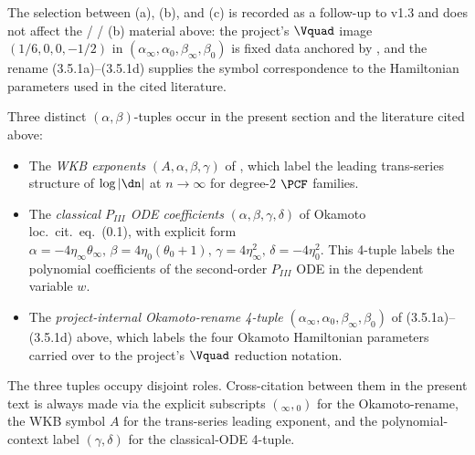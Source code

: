 The selection between (a), (b), and (c) is recorded as a
follow-up to v1.3 and does not affect the  /
 / (b) material above:
the project's $\Vquad$ image $(1/6, 0, 0, -1/2)$ in
$(\alpha_\infty, \alpha_0, \beta_\infty, \beta_0)$ is fixed
data anchored by \cite{iwasaki1991from, ohyama2006studies},
and the rename (3.5.1a)--(3.5.1d) supplies the symbol
correspondence to the Hamiltonian parameters used in the cited
literature.

\begin{remark}
\label{rem:alpha-beta-tuples}
Three distinct $(\alpha, \beta)$-tuples occur in the present
section and the literature cited above:
\begin{itemize}
\item The {\em WKB exponents} $(A, \alpha, \beta, \gamma)$ of
, which label the leading trans-series
structure of $\log|\dn|$ at $n \to \infty$ for degree-$2$
$\PCF$ families.
\item The {\em classical $P_{III}$ ODE coefficients}
$(\alpha, \beta, \gamma, \delta)$ of Okamoto loc.\ cit.\
eq.\ (0.1), with explicit form
$\alpha = -4 \eta_\infty \theta_\infty,\,
\beta = 4 \eta_0 (\theta_0 + 1),\,
\gamma = 4 \eta_\infty^{2},\,
\delta = -4 \eta_0^{2}$. This 4-tuple labels the polynomial
coefficients of the second-order $P_{III}$ ODE in the
dependent variable $w$.
\item The {\em project-internal Okamoto-rename 4-tuple}
$(\alpha_\infty, \alpha_0, \beta_\infty, \beta_0)$ of
(3.5.1a)--(3.5.1d) above, which labels the four Okamoto
Hamiltonian parameters carried over to the project's
$\Vquad$ reduction notation.
\end{itemize}
The three tuples occupy disjoint roles. Cross-citation between
them in the present text is always made via the explicit
subscripts $({}_\infty, {}_0)$ for the Okamoto-rename, the WKB
symbol $A$ for the trans-series leading exponent, and the
polynomial-context label $(\gamma, \delta)$ for the
classical-ODE 4-tuple.
\end{remark}

